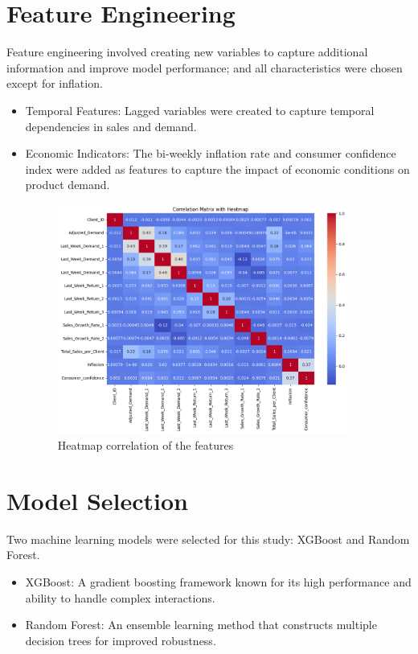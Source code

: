 \documentclass{article}
\begin{document}
\section{Feature Engineering}
Feature engineering involved creating new variables to capture additional information and improve model performance; and all characteristics were chosen except for inflation.
\begin{itemize}
    \item Temporal Features: Lagged variables were created to capture temporal dependencies in sales and demand.
    \item Economic Indicators: The bi-weekly inflation rate and consumer confidence index were added as features to capture the impact of economic conditions on product demand.

    
\begin{figure}[H] 
    \begin{center}
    \centering
    \includegraphics[width=0.9\textwidth]{images/output.png}
    \caption{Heatmap correlation of the features}
    \end{center}
\end{figure}    

\end{itemize}

\section{Model Selection}

Two machine learning models were selected for this study: XGBoost and Random Forest.
\begin{itemize}
    \item XGBoost: A gradient boosting framework known for its high performance and ability to handle complex interactions.
    \item Random Forest: An ensemble learning method that constructs multiple decision trees for improved robustness.
\end{itemize}
\end{document}
